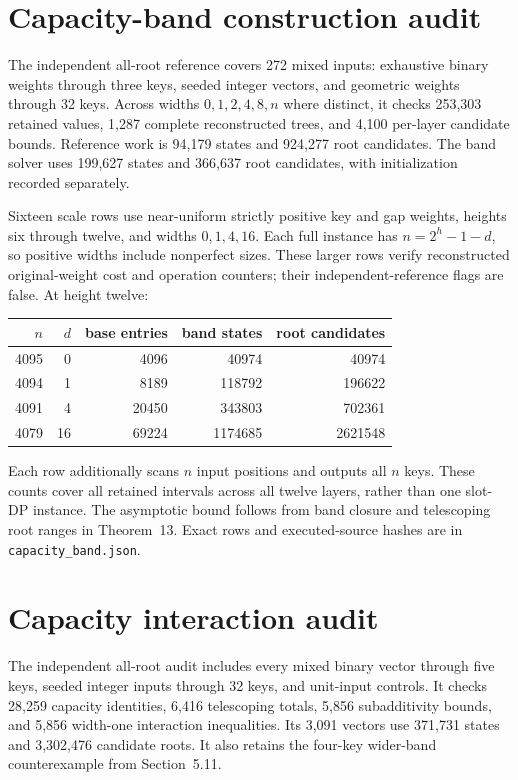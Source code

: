 \documentclass[11pt]{article}
\begin{document}
\section{Capacity-band construction audit}
\label{app:capacity-band}
The independent all-root reference covers 272 mixed inputs: exhaustive
binary weights through three keys, seeded integer vectors, and geometric
weights through 32 keys. Across widths $0,1,2,4,8,n$ where distinct, it
checks 253,303 retained values, 1,287 complete reconstructed trees, and
4,100 per-layer candidate bounds. Reference work is 94,179 states and
924,277 root candidates. The band solver uses 199,627 states and 366,637
root candidates, with initialization recorded separately.

Sixteen scale rows use near-uniform strictly positive key and gap weights,
heights six through twelve, and widths $0,1,4,16$. Each full instance has
$n=2^h-1-d$, so positive widths include nonperfect sizes. These larger rows
verify reconstructed original-weight cost and operation counters; their
independent-reference flags are false. At height twelve:
\begin{center}
\begin{tabular}{rrrrr}
\toprule
$n$ & $d$ & base entries & band states & root candidates\\
\midrule
4095 & 0 & 4096 & 40974 & 40974\\
4094 & 1 & 8189 & 118792 & 196622\\
4091 & 4 & 20450 & 343803 & 702361\\
4079 & 16 & 69224 & 1174685 & 2621548\\
\bottomrule
\end{tabular}
\end{center}
Each row additionally scans $n$ input positions and outputs all $n$ keys.
These counts cover all retained intervals across all twelve layers, rather
than one slot-DP instance. The asymptotic bound follows from band closure
and telescoping root ranges in Theorem~13. Exact rows
and executed-source hashes are in \texttt{capacity\_band.json}.

\section{Capacity interaction audit}\label{app:capacity-interaction}
The independent all-root audit includes every mixed binary vector through
five keys, seeded integer inputs through 32 keys, and unit-input controls.
It checks 28,259 capacity identities, 6,416 telescoping totals, 5,856
subadditivity bounds, and 5,856 width-one interaction inequalities. Its
3,091 vectors use 371,731 states and 3,302,476 candidate roots. It also
retains the four-key wider-band counterexample from
Section~5.11.
\end{document}
